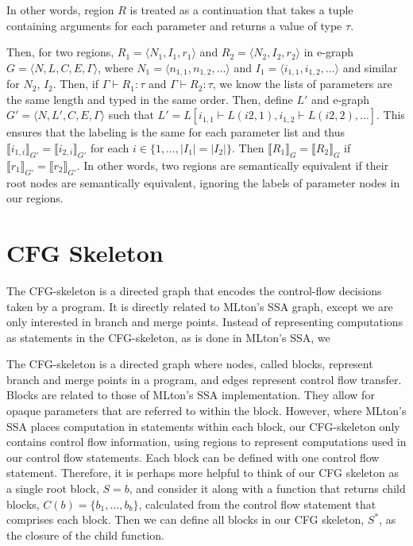 \documentclass{article}
\begin{document}
In other words, region $R$ is treated as a continuation that takes a tuple containing arguments for each parameter and returns a value of type $\tau$.

Then, for two regions, $R_1 = \langle N_1, I_1, r_1 \rangle$ and $R_2 = \langle N_2, I_2, r_2 \rangle$ in e-graph $G=\langle N, L, C, E, \Gamma \rangle$, where $N_1 = \langle n_{1, 1}, n_{1, 2}, \dots \rangle$ and $I_1 = \langle i_{1, 1}, i_{1, 2}, \dots \rangle$ and similar for $N_2$, $I_2$. Then, if $\Gamma \vdash R_1 : \tau$ and $\Gamma \vdash R_2 : \tau$, we know the lists of parameters are the same length and typed in the same order. Then, define $L'$ and e-graph $G'=\langle N, L', C, E, \Gamma \rangle$ such that $L' = L[i_{1,1} \vdash L(i{2,1}), i_{1,2} \vdash L(i{2,2}), \dots ]$. This ensures that the labeling is the same for each parameter list and thus $\llbracket i_{1, i} \rrbracket_{G'} = \llbracket i_{2, i} \rrbracket_{G'}$ for each $i \in \{1, \dots, |I_1| = |I_2| \}$. Then $\llbracket R_1 \rrbracket_{G} = \llbracket R_2 \rrbracket_{G}$ if $\llbracket r_1 \rrbracket_{G'} = \llbracket r_2 \rrbracket_{G'}$. In other words, two regions are semantically equivalent if their root nodes are semantically equivalent, ignoring the labels of parameter nodes in our regions.

\section{CFG Skeleton}

The CFG-skeleton is a directed graph that encodes the control-flow decisions taken by a program. It is directly related to MLton's SSA graph, except we are only interested in branch and merge points. Instead of representing computations as statements in the CFG-skeleton, as is done in MLton's SSA, we

The CFG-skeleton is a directed graph where nodes, called blocks, represent branch and merge points in a program, and edges represent control flow transfer. Blocks are related to those of MLton's SSA implementation. They allow for opaque parameters that are referred to within the block. However, where MLton's SSA places computation in statements within each block, our CFG-skeleton only contains control flow information, using regions to represent computations used in our control flow statements. Each block can be defined with one control flow statement. Therefore, it is perhaps more helpful to think of our CFG skeleton as a single root block, $S = b$, and consider it along with a function that returns child blocks, $C(b) = \{b_1, \dots, b_b\}$, calculated from the control flow statement that comprises each block. Then we can define all blocks in our CFG skeleton, $S^*$, as the closure of the child function.
\end{document}
